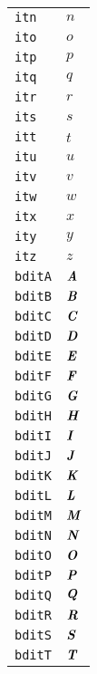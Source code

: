 \begin{longtable}{ll}
\texttt{itn}&${}{\textit{n}}{}$\\
\texttt{ito}&${}{\textit{o}}{}$\\
\texttt{itp}&${}{\textit{p}}{}$\\
\texttt{itq}&${}{\textit{q}}{}$\\
\texttt{itr}&${}{\textit{r}}{}$\\
\texttt{its}&${}{\textit{s}}{}$\\
\texttt{itt}&${}{\textit{t}}{}$\\
\texttt{itu}&${}{\textit{u}}{}$\\
\texttt{itv}&${}{\textit{v}}{}$\\
\texttt{itw}&${}{\textit{w}}{}$\\
\texttt{itx}&${}{\textit{x}}{}$\\
\texttt{ity}&${}{\textit{y}}{}$\\
\texttt{itz}&${}{\textit{z}}{}$\\
\texttt{bditA}&${}{\textbf{\textit{A}}}{}$\\
\texttt{bditB}&${}{\textbf{\textit{B}}}{}$\\
\texttt{bditC}&${}{\textbf{\textit{C}}}{}$\\
\texttt{bditD}&${}{\textbf{\textit{D}}}{}$\\
\texttt{bditE}&${}{\textbf{\textit{E}}}{}$\\
\texttt{bditF}&${}{\textbf{\textit{F}}}{}$\\
\texttt{bditG}&${}{\textbf{\textit{G}}}{}$\\
\texttt{bditH}&${}{\textbf{\textit{H}}}{}$\\
\texttt{bditI}&${}{\textbf{\textit{I}}}{}$\\
\texttt{bditJ}&${}{\textbf{\textit{J}}}{}$\\
\texttt{bditK}&${}{\textbf{\textit{K}}}{}$\\
\texttt{bditL}&${}{\textbf{\textit{L}}}{}$\\
\texttt{bditM}&${}{\textbf{\textit{M}}}{}$\\
\texttt{bditN}&${}{\textbf{\textit{N}}}{}$\\
\texttt{bditO}&${}{\textbf{\textit{O}}}{}$\\
\texttt{bditP}&${}{\textbf{\textit{P}}}{}$\\
\texttt{bditQ}&${}{\textbf{\textit{Q}}}{}$\\
\texttt{bditR}&${}{\textbf{\textit{R}}}{}$\\
\texttt{bditS}&${}{\textbf{\textit{S}}}{}$\\
\texttt{bditT}&${}{\textbf{\textit{T}}}{}$\\

\end{longtable}
